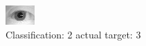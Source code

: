 \begin{figure}[h!]
\begin{center}
\includegraphics[width=0.60\columnwidth]{figures/ID1118_class_2_target_3.png}
\end{center}
\caption{ Classification: 2 actual target: 3}
\label{fig:ID1118_class_2_target_3}
\end{figure}
